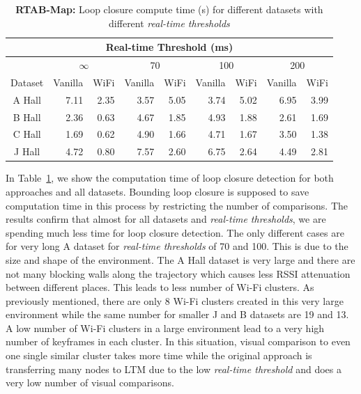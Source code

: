 \begin{table}
\caption{{\bf RTAB-Map:} Loop closure compute time (s) for different datasets with different {\it real-time thresholds} }
\begin{center}
\begin{tabular}{| c | r r | r r | r r | r r | } 
\hline 
\multicolumn{9}{|c|}{Real-time Threshold (ms)} \\ 
\hline 
 & \multicolumn{2}{|c|}{$\infty$} & \multicolumn{2}{|c|}{70} & \multicolumn{2}{|c|}{100} & \multicolumn{2}{|c|}{200} \\ 
\hline 
 Dataset & \multicolumn{1}{|c|}{Vanilla} & \multicolumn{1}{|c|}{WiFi} & \multicolumn{1}{|c|}{Vanilla} & \multicolumn{1}{|c|}{WiFi} & \multicolumn{1}{|c|}{Vanilla} & \multicolumn{1}{|c|}{WiFi} & \multicolumn{1}{|c|}{Vanilla} & \multicolumn{1}{|c|}{WiFi} \\ 
\hline 
 A Hall & 7.11 & 2.35 & 3.57 & 5.05 & 3.74 & 5.02 & 6.95 & 3.99 \\ 
 B Hall & 2.36 & 0.63 & 4.67 & 1.85 & 4.93 & 1.88 & 2.61 & 1.69 \\ 
 C Hall & 1.69 & 0.62 & 4.90 & 1.66 & 4.71 & 1.67 & 3.50 & 1.38 \\ 
 J Hall & 4.72 & 0.80 & 7.57 & 2.60 & 6.75 & 2.64 & 4.49 & 2.81 \\ 
\hline 
\end{tabular} 
\label{table:rtabmap_bounding}
\end{center}
\end{table} 

In Table~\ref{table:rtabmap_bounding}, we show the computation time of loop closure detection for both approaches and all datasets. 
{Bounding loop closure} is supposed to save computation time in this process by restricting the number of comparisons. 
The results confirm that almost for all datasets and {\it real-time thresholds}, we are spending much less time for loop closure detection. 
The only different cases are for very long A dataset for {\it real-time thresholds} of 70 and 100. 
This is due to the size and shape of the environment. 
The A Hall dataset is very large and there are not many blocking walls along the trajectory which causes less RSSI attenuation between different places. 
This leads to less number of Wi-Fi clusters. 
As previously mentioned, there are only 8 Wi-Fi clusters created in this very large environment while the same number for smaller J and B datasets are 19 and 13. 
A low number of Wi-Fi clusters in a large environment lead to a very high number of keyframes in each cluster. 
In this situation, visual comparison to even one single {similar cluster} takes more time while the original approach is transferring many nodes to LTM due to the low {\it real-time threshold} and does a very low number of visual comparisons.

